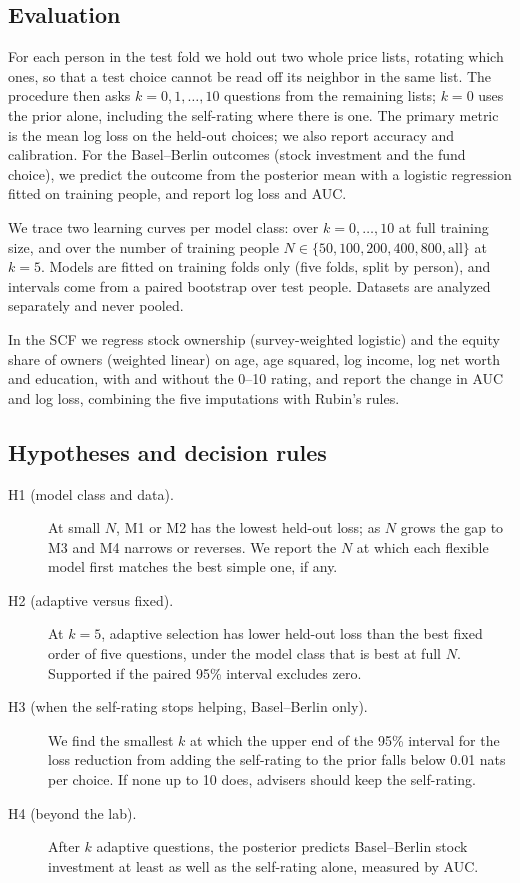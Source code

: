 \documentclass{article}
\begin{document}
\subsection{Evaluation}
For each person in the test fold we hold out two whole price lists, rotating which ones, so that a test choice cannot be read off its neighbor in the same list. The procedure then asks $k = 0, 1, \dots, 10$ questions from the remaining lists; $k = 0$ uses the prior alone, including the self-rating where there is one. The primary metric is the mean log loss on the held-out choices; we also report accuracy and calibration. For the Basel--Berlin outcomes (stock investment and the fund choice), we predict the outcome from the posterior mean with a logistic regression fitted on training people, and report log loss and AUC.

We trace two learning curves per model class: over $k = 0, \dots, 10$ at full training size, and over the number of training people $N \in \{50, 100, 200, 400, 800, \text{all}\}$ at $k = 5$. Models are fitted on training folds only (five folds, split by person), and intervals come from a paired bootstrap over test people. Datasets are analyzed separately and never pooled.

In the SCF we regress stock ownership (survey-weighted logistic) and the equity share of owners (weighted linear) on age, age squared, log income, log net worth and education, with and without the 0--10 rating, and report the change in AUC and log loss, combining the five imputations with Rubin's rules.

\subsection{Hypotheses and decision rules}
\begin{description}
  \item[H1 (model class and data).] At small $N$, M1 or M2 has the lowest held-out loss; as $N$ grows the gap to M3 and M4 narrows or reverses. We report the $N$ at which each flexible model first matches the best simple one, if any.
  \item[H2 (adaptive versus fixed).] At $k = 5$, adaptive selection has lower held-out loss than the best fixed order of five questions, under the model class that is best at full $N$. Supported if the paired 95\% interval excludes zero.
  \item[H3 (when the self-rating stops helping, Basel--Berlin only).] We find the smallest $k$ at which the upper end of the 95\% interval for the loss reduction from adding the self-rating to the prior falls below 0.01 nats per choice. If none up to 10 does, advisers should keep the self-rating.
  \item[H4 (beyond the lab).] After $k$ adaptive questions, the posterior predicts Basel--Berlin stock investment at least as well as the self-rating alone, measured by AUC.
\end{description}
\end{document}
